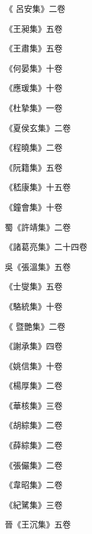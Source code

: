 \begin{pinyinscope}
 《
 呂安集》二卷



 《王昶集》五卷



 《王肅集》五卷



 《何晏集》十卷



 《應瑗集》十卷



 《杜摯集》一卷



 《夏侯玄集》二卷



 《程曉集》二卷



 《阮籍集》五卷



 《嵇康集》十五卷



 《鐘會集》十卷



 蜀《許靖集》二卷



 《諸葛亮集》二十四卷



 吳《張溫集》五卷



 《士燮集》五卷



 《駱統集》十卷



 《
 暨艷集》二卷



 《謝承集》四卷



 《姚信集》十卷



 《楊厚集》二卷



 《華核集》三卷



 《胡綜集》二卷



 《薛綜集》二卷



 《張儼集》二卷



 《韋昭集》二卷



 《紀騭集》三卷



 晉《王沉集》五卷




\end{pinyinscope}
